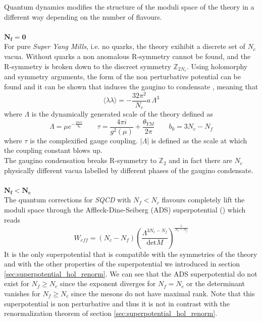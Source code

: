 Quantum dynamics modifies the structure of the moduli space of the theory in a different way depending on the number of flavours.
\\
\\
{$\mathbf{N_f= 0}$}\\
 For pure \emph{Super Yang Mills}, i.e. no quarks, the theory exihibit a discrete set of $N_c$ vacua. 
Without quarks a non anomalous R-symmetry cannot be found,
and the R-symmetry is broken down to the discreet symmetry $\mathbb{Z}_{2 N_c}$.
Using holomorphy and symmetry arguments, the form of the non perturbative potential can be found and it can be shown that induces the gaugino to condensate \cite{Veneziano:1982ah}, meaning that 
\begin{equation}
\langle \lambda \lambda \rangle = - \frac{32 \pi^2}{N_c} a \, \Lambda^3
\end{equation}
where $\Lambda$ is the dynamically generated scale of the theory defined as
\begin{equation}
\Lambda = \mu e^{-\frac{2 \pi i \tau}{b_0}} \qquad 
\tau  = \frac{4 \pi i}{g^2 (\mu) } + \frac{\theta_{YM}}{2 \pi}  \qquad b_0 = 3 N_c - N_f
\end{equation}
where $\tau$ is the complexified gauge coupling.
$|\Lambda|$ is defined as the scale at which the coupling constant blows up.\\
The gaugino condensation breaks R-symmetry to $\mathbb{Z}_2$ and in fact there are $N_c$ physically different vacua labelled by different phases of the gaugino condensate.
\\
\\
$\mathbf{ N_f < N_c}$\\
The quantum corrections for \emph{SQCD} with $N_f < N_c$ flavours completely lift the moduli space through the Affleck-Dine-Seiberg (ADS) superpotential (\cite{Davis:1983mz}\cite{Affleck:1983mk}) which reads
\begin{equation}
W_{eff} = \left( N_c - N_f  \right)\left( 
\frac{\Lambda^{3N_c -  N_f }}
{\mathrm{det} {M}}
\right)^{ \frac{1}{N_c - N_f}}
\end{equation}
It is the only superpotential that is compatible with the symmetries of the theory and with the other properties of the superpotential we introduced in section \ref{sec:superpotential_hol_renorm}.
We can see that the ADS superpotential do not exist for $N_f \geq N_c$ since the exponent diverges for $N_f = N_c$ or the determinant vanishes for $N_f \ge N_c$ since the mesons do not have maximal rank.
Note that this superpotential is non perturbative and thus it is not in contrast with the renormalization theorem of section \ref{sec:superpotential_hol_renorm}.
